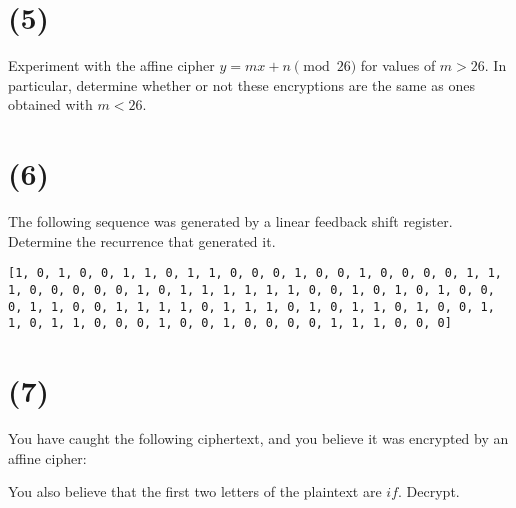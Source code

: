 \documentclass[12pt]{article}
\begin{document}
\section*{(5)} Experiment with the affine cipher $y = m x + n \pmod{26}$ for values of $m > 26$. In particular, determine whether or not these encryptions are the same as ones obtained with $m < 26$.

\section*{(6)} The following sequence was generated by a linear feedback shift register. Determine the recurrence that generated it.

\texttt{[1, 0, 1, 0, 0, 1, 1, 0, 1, 1, 0, 0, 0, 1, 0, 0, 1, 0, 0, 0, 0, 1, 1,
1, 0, 0, 0, 0, 0, 1, 0, 1, 1, 1, 1, 1, 1, 0, 0, 1, 0, 1, 0, 1, 0, 0,
0, 1, 1, 0, 0, 1, 1, 1, 1, 0, 1, 1, 1, 0, 1, 0, 1, 1, 0, 1, 0, 0, 1,
1, 0, 1, 1, 0, 0, 0, 1, 0, 0, 1, 0, 0, 0, 0, 1, 1, 1, 0, 0, 0]}

\section*{(7)} You have caught the following ciphertext, and you believe it was encrypted by an affine cipher:


You also believe that the first two letters of the plaintext are $if$. Decrypt.
\end{document}
